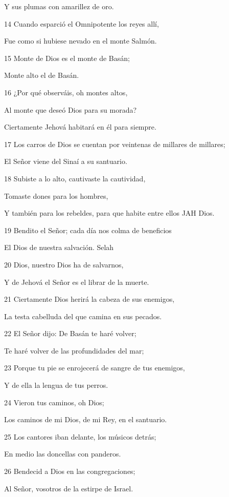 \par Y sus plumas con amarillez de oro.
\par 14 Cuando esparció el Omnipotente los reyes allí,
\par Fue como si hubiese nevado en el monte Salmón.
\par 15 Monte de Dios es el monte de Basán;
\par Monte alto el de Basán.
\par 16 ¿Por qué observáis, oh montes altos,
\par Al monte que deseó Dios para su morada?
\par Ciertamente Jehová habitará en él para siempre.
\par 17 Los carros de Dios se cuentan por veintenas de millares de millares;
\par El Señor viene del Sinaí a su santuario.
\par 18 Subiste a lo alto, cautivaste la cautividad,
\par Tomaste dones para los hombres,
\par Y también para los rebeldes, para que habite entre ellos JAH Dios.
\par 19 Bendito el Señor; cada día nos colma de beneficios
\par El Dios de nuestra salvación. Selah
\par 20 Dios, nuestro Dios ha de salvarnos,
\par Y de Jehová el Señor es el librar de la muerte.
\par 21 Ciertamente Dios herirá la cabeza de sus enemigos,
\par La testa cabelluda del que camina en sus pecados.
\par 22 El Señor dijo: De Basán te haré volver;
\par Te haré volver de las profundidades del mar;
\par 23 Porque tu pie se enrojecerá de sangre de tus enemigos,
\par Y de ella la lengua de tus perros.
\par 24 Vieron tus caminos, oh Dios;
\par Los caminos de mi Dios, de mi Rey, en el santuario.
\par 25 Los cantores iban delante, los músicos detrás;
\par En medio las doncellas con panderos.
\par 26 Bendecid a Dios en las congregaciones;
\par Al Señor, vosotros de la estirpe de Israel.
